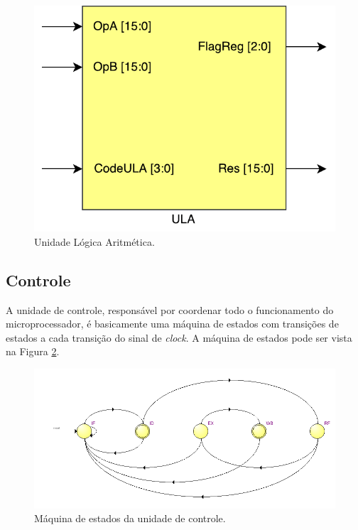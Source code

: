 \documentclass[11pt,a4paper,titlepage]{article}
\begin{document}
\begin{figure}[!h]
\centering
\includegraphics[scale=0.4]{images/ULA.pdf}
\caption{Unidade Lógica Aritmética.}
\label{fig:ula}
\end{figure}

\subsection{Controle}\label{subsec:imp-ctrl}

A unidade de controle, responsável por coordenar todo o funcionamento do microprocessador, é basicamente uma máquina de estados com transições de estados a cada transição do sinal de \textit{clock}. A máquina de estados pode ser vista na Figura \ref{fig:statemachine}.

\begin{figure}[!h]
\centering
\includegraphics[scale=0.55]{images/statemachine.png}
\caption{Máquina de estados da unidade de controle.}
\label{fig:statemachine}
\end{figure}
\end{document}

